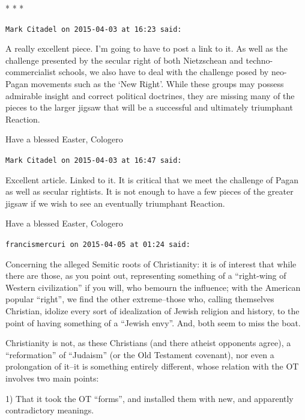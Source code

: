 
\begin{center}* * *\end{center}

\begin{footnotesize}
\begin{sffamily}
\texttt{Mark Citadel on 2015-04-03 at 16:23 said:}

A really excellent piece. I'm going to have to post a link to it. As well as the challenge presented by the secular right of both Nietzschean and techno-commercialist schools, we also have to deal with the challenge posed by neo-Pagan movements such as the `New Right'. While these groups may possess admirable insight and correct political doctrines, they are missing many of the pieces to the larger jigsaw that will be a successful and ultimately triumphant Reaction.

Have a blessed Easter, Cologero

\hfill

\texttt{Mark Citadel on 2015-04-03 at 16:47 said:}

Excellent article. Linked to it. It is critical that we meet the challenge of Pagan as well as secular rightists. It is not enough to have a few pieces of the greater jigsaw if we wish to see an eventually triumphant Reaction.

Have a blessed Easter, Cologero

\hfill

\texttt{francismercuri on 2015-04-05 at 01:24 said:}

Concerning the alleged Semitic roots of Christianity: it is of interest that while there are those, as you point out, representing something of a ``right-wing of Western civilization'' if you will, who bemourn the influence; with the American popular ``right'', we find the other extreme--those who, calling themselves Christian, idolize every sort of idealization of Jewish religion and history, to the point of having something of a ``Jewish envy''. And, both seem to miss the boat.

Christianity is not, as these Christians (and there atheist opponents agree), a ``reformation'' of ``Judaism'' (or the Old Testament covenant), nor even a prolongation of it--it is something entirely different, whose relation with the OT involves two main points:

1) That it took the OT ``forms'', and installed them with new, and apparently contradictory meanings.


\end{sffamily}
\end{footnotesize}
